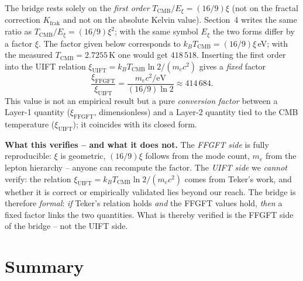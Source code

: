 The bridge rests solely on the \emph{first order} $T_{\text{CMB}}/E_\xi =
(16/9)\xi$ (not on the fractal correction $K_{\text{frak}}$ and not on the
absolute Kelvin value).
Section~4 writes the same ratio as $T_{\text{CMB}}/E_\xi=(16/9)\xi^2$; with the
same symbol $E_\xi$ the two forms differ by a factor $\xi$. The factor given
below corresponds to $k_B T_{\text{CMB}}=(16/9)\xi$\,eV; with the measured
$T_{\text{CMB}}=2.7255$\,K one would get $418\,518$. Inserting the first order into the UIFT relation
$\xi_{\text{UIFT}} = k_B T_{\text{CMB}}\ln 2/(m_e c^2)$ gives a \emph{fixed}
factor
\[
  \frac{\xi_{\text{FFGFT}}}{\xi_{\text{UIFT}}}
  = \frac{m_e c^2/\text{eV}}{(16/9)\ln 2} \approx 414\,684 .
\]
This value is not an empirical result but a pure \emph{conversion factor}
between a Layer-1 quantity ($\xi_{\text{FFGFT}}$, dimensionless) and a
Layer-2 quantity tied to the CMB temperature ($\xi_{\text{UIFT}}$); it
coincides with its closed form.

\textbf{What this verifies -- and what it does not.} The \emph{FFGFT side} is
fully reproducible: $\xi$ is geometric, $(16/9)\xi$ follows from the mode count,
$m_e$ from the lepton hierarchy -- anyone can recompute the factor. The
\emph{UIFT side} we \emph{cannot} verify: the relation
$\xi_{\text{UIFT}}=k_B T_{\text{CMB}}\ln 2/(m_e c^2)$ comes from Teker's work,
and whether it is correct or empirically validated lies beyond our reach. The
bridge is therefore \emph{formal}: \emph{if} Teker's relation holds \emph{and}
the FFGFT values hold, \emph{then} a fixed factor links the two quantities.
What is thereby verified is the FFGFT side of the bridge -- not the UIFT side.

\section{Summary}

